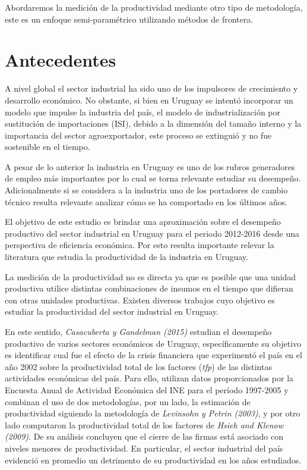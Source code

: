 \documentclass[
]{article}
\begin{document}
Abordaremos la medición de la productividad mediante otro tipo de
metodología, este es un enfoque semi-paramétrico utilizando métodos de
frontera.

\hypertarget{antecedentes}{%
\section{Antecedentes}\label{antecedentes}}

A nivel global el sector industrial ha sido uno de los impulsores de
crecimiento y desarrollo económico. No obstante, si bien en Uruguay se
intentó incorporar un modelo que impulse la industria del país, el
modelo de industrialización por sustitución de importaciones (ISI),
debido a la dimensión del tamaño interno y la importancia del sector
agroexportador, este proceso se extinguió y no fue sostenible en el
tiempo.

A pesar de lo anterior la industria en Uruguay es uno de los rubros
generadores de empleo más importantes por lo cual se torna relevante
estudiar su desempeño. Adicionalmente si se considera a la industria uno
de los portadores de cambio técnico resulta relevante analizar cómo se
ha comportado en los últimos años.

El objetivo de este estudio es brindar una aproximación sobre el
desempeño productivo del sector industrial en Uruguay para el periodo
2012-2016 desde una perspectiva de eficiencia económica. Por esto
resulta importante relevar la literatura que estudia la productividad de
la industria en Uruguay.

La medición de la productividad no es directa ya que es posible que una
unidad productiva utilice distintas combinaciones de insumos en el
tiempo que difieran con otras unidades productivas. Existen diversos
trabajos cuyo objetivo es estudiar la productividad del sector
industrial en Uruguay.

En este sentido, \emph{Casacuberta y Gandelman (2015)} estudian el
desempeño productivo de varios sectores económicos de Uruguay,
específicamente su objetivo es identificar cual fue el efecto de la
crisis financiera que experimentó el país en el año 2002 sobre la
productividad total de los factores (\emph{tfp}) de las distintas
actividades económicas del país. Para ello, utilizan datos
proporcionados por la Encuesta Anual de Actividad Económica del INE para
el período 1997-2005 y combinan el uso de dos metodologías, por un lado,
la estimación de productividad siguiendo la metodología de
\emph{Levinsohn y Petrin (2003)}, y por otro lado computaron la
productividad total de los factores de \emph{Hsieh and Klenow (2009)}.
De su análisis concluyen que el cierre de las firmas está asociado con
niveles menores de productividad. En particular, el sector industrial
del país evidenció en promedio un detrimento de su productividad en los
años estudiados.
\end{document}
